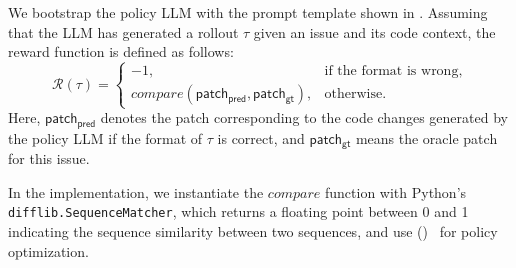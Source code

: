 {
\newcommand\seed{\mathcal D_\mathsf{seed}}
\newcommand\formprompt{\mathsf{form\mbox{-}prompt}}
\newcommand\question{q}
\newcommand\issue{\mathsf{issue}}
\newcommand\context{\mathsf{ctx}}
\newcommand\predpatch{\mathsf{patch_{pred}}}
\newcommand\oracle{\mathsf{patch_{gt}}}
\newcommand\prob[1]{\mathbf P(#1)}
\newcommand\oldpolicy{\mathit{\pi_{\theta_{\mathrm{old}}}}}
\newcommand\policy{\mathit{\pi_{\theta}}}
\newcommand\refpolicy{\mathit{\pi_{\mathrm{ref}}}}
\newcommand\ratio{\frac {\policy(o_i \mid \question)} {\oldpolicy(o_i \mid \question)}}
\newcommand\clip{\mathrm{clip}}
\newcommand\kldiv{D_{\mathrm{KL}}}
We bootstrap the policy LLM with the prompt template shown in .
Assuming that the LLM has generated a rollout $\tau$ given an issue and its code context,
the reward function is defined as follows:
\begin{equation}
\mathcal R(\tau) = \begin{cases}
    -1, &\text{if the format is wrong},\\
    \mathit{compare}(\predpatch, \oracle), & \text{otherwise}.
\end{cases}
\label{eq:reward}
\end{equation}
Here, $\predpatch$ denotes the patch corresponding to the code changes generated by the policy LLM if the format of $\tau$ is correct, and $\oracle$ means the oracle patch for this issue.

In the implementation, we instantiate the $\mathit{compare}$ function with Python's \texttt{difflib.SequenceMatcher}, which returns a floating point between 0 and 1 indicating the sequence similarity between two sequences, and use \grpofull (\grpo)~\cite{deepseekmath} for policy optimization.

}

